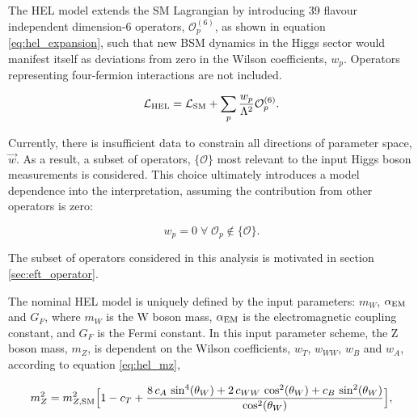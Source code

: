 The HEL model extends the SM Lagrangian by introducing 39 flavour independent dimension-6 operators, $\mathcal{O}^{(6)}_p$, as shown in equation \ref{eq:hel_expansion}, such that new BSM dynamics in the Higgs sector would manifest itself as deviations from zero in the Wilson coefficients, $w_p$. Operators representing four-fermion interactions are not included. 

\begin{equation}\label{eq:hel_expansion}
    \mathcal{L}_{\rm{HEL}} = \mathcal{L}_{\rm{SM}} + \sum_p \frac{w_p}{\Lambda^2}\mathcal{O}^{(6)}_p .
\end{equation}

\noindent
Currently, there is insufficient data to constrain all directions of parameter space, $\vec{w}$. As a result, a subset of operators, $\{\mathcal{O}\}$  most relevant to the input Higgs boson measurements is considered. This choice ultimately introduces a model dependence into the interpretation, assuming the contribution from other operators is zero: 

\begin{equation}
  w_p=0 \; \forall \; \mathcal{O}_p \notin \{\mathcal{O}\}.   
\end{equation}

\noindent
The subset of operators considered in this analysis is motivated in section \ref{sec:eft_operator}.

The nominal HEL model is uniquely defined by the input parameters: $m_W$, $\alpha_{\rm{EM}}$ and $G_F$, where $m_W$ is the W boson mass, $\alpha_{\rm{EM}}$ is the electromagnetic coupling constant, and $G_F$ is the Fermi constant. In this input parameter scheme, the Z boson mass, $m_Z$, is dependent on the Wilson coefficients, $w_T$, $w_{WW}$, $w_B$ and $w_A$, according to equation \ref{eq:hel_mz},

\begin{equation}\label{eq:hel_mz}
    m_Z^2 = m_{Z,\rm{SM}}^2 \Big[ 1-c_T+\frac{8\,c_A\,\sin^4(\theta_W)+2\,c_{WW}\,\cos^2(\theta_W)+c_B\,\sin^2(\theta_W)}{\cos^2(\theta_W)} \Big],
\end{equation}

